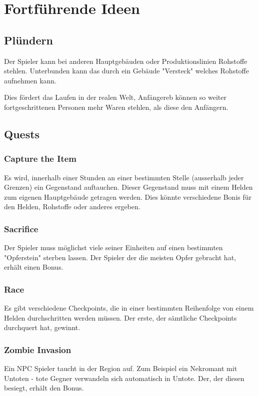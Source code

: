 \chapter{Fortführende Ideen}
\label{Fortführende Ideen}

\section{Plündern}
Der Spieler kann bei anderen Hauptgebäuden oder Produktionslinien Rohstoffe stehlen. Unterbunden kann das durch ein Gebäude "Versteck" welches Rohstoffe aufnehmen kann.

Dies fördert das Laufen in der realen Welt, Anfängereb können so weiter fortgeschrittenen Personen mehr Waren stehlen, als diese den Anfängern.

\section{Quests}

\subsection{Capture the Item}
Es wird, innerhalb einer Stunden an einer bestimmten Stelle (ausserhalb jeder Grenzen) ein Gegenstand auftauchen. Dieser Gegenstand muss mit einem Helden zum eigenen Hauptgebäude getragen werden. Dies könnte verschiedene Bonis für den Helden, Rohstoffe oder anderes ergeben.

\subsection{Sacrifice}
Der Spieler muss möglichst viele seiner Einheiten auf einen bestimmten "Opferstein" sterben lassen. Der Spieler der die meisten Opfer gebracht hat, erhält einen Bonus.

\subsection{Race}
Es gibt verschiedene Checkpoints, die in einer bestimmten Reihenfolge von einem Helden durchschritten werden müssen. Der erste, der sämtliche Checkpoints durchquert hat, gewinnt.

\subsection{Zombie Invasion}
Ein NPC Spieler taucht in der Region auf. Zum Beispiel ein Nekromant mit Untoten - tote Gegner verwandeln sich automatisch in Untote. Der, der diesen besiegt, erhält den Bonus.



